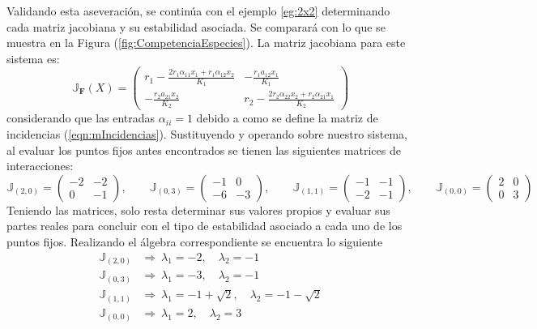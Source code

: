 \setlength{\parindent}{0cm}Validando esta aseveración, se continúa con el ejemplo \ref{eg:2x2} determinando cada matriz jacobiana y su estabilidad asociada. Se comparará con lo que se muestra en la Figura (\ref{fig:CompetenciaEspecies}). La matriz jacobiana para este sistema es:
\begin{equation}\label{eqn:Jacobiano2}
	\mathbb{J}_\mathbf{F}(X)=\begin{pmatrix}
		r_1-\frac{2r_1\alpha_{11}x_1+r_1\alpha_{12}x_2}{K_1} & -\frac{r_1a_{12}x_1}{K_1}\\
		-\frac{r_2a_{21}x_2}{K_2} & r_2-\frac{2r_2\alpha_{22}x_2+r_2\alpha_{21}x_1}{K_2}
	\end{pmatrix}
\end{equation}
considerando que las entradas $\alpha_{ii}=1$ debido a como se define la matriz de incidencias (\ref{eqn:mIncidencias}). Sustituyendo y operando sobre nuestro sistema, al evaluar los puntos fijos antes encontrados se tienen las siguientes matrices de interacciones:
$$
\mathbb{J}_{(2,0)} = \begin{pmatrix}
	-2 & -2\\
	0 & -1
\end{pmatrix},\qquad \mathbb{J}_{(0,3)}=\begin{pmatrix}
	-1 & 0\\
	-6 & -3
\end{pmatrix},\qquad \mathbb{J}_{(1,1)}=\begin{pmatrix}
	-1 & -1\\
	-2 & -1
\end{pmatrix},\qquad \mathbb{J}_{(0,0)}=\begin{pmatrix}
	2 & 0 \\
	0 & 3
\end{pmatrix}
$$
Teniendo las matrices, solo resta determinar sus valores propios y evaluar sus partes reales para concluir con el tipo de estabilidad asociado a cada uno de los puntos fijos. Realizando el álgebra correspondiente se encuentra lo siguiente
\begin{align*}
	\mathbb{J}_{(2,0)}&\Longrightarrow\ \lambda_1 = -2,\quad\lambda_2 = -1\\
	\mathbb{J}_{(0,3)}&\Longrightarrow\ \lambda_1 = -3,\quad\lambda_2 = -1\\
	\mathbb{J}_{(1,1)}&\Longrightarrow\ \lambda_1 = -1+\sqrt{2},\quad\lambda_2 = -1-\sqrt{2}\\
	\mathbb{J}_{(0,0)}&\Longrightarrow\ \lambda_1 = 2,\quad\lambda_2 = 3\\
\end{align*}
